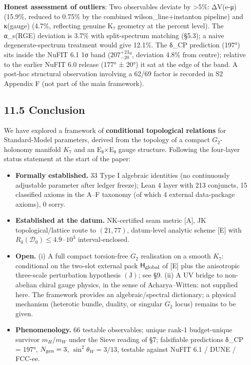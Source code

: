 \documentclass[11pt,a4paper]{article}
\begin{document}
\textbf{Honest assessment of outliers}: Two observables deviate by \textgreater5\%: ΔV(e-μ) (15.9\%, reduced to 0.75\% by the combined wilson\_\allowbreak{}line+instanton pipeline) and κ(gauge) (4.7\%, reflecting genuine K₇ geometry at the percent level). The α\_\allowbreak{}s(RGE) deviation is 3.7\% with split-spectrum matching (§5.3); a naive degenerate-spectrum treatment would give 12.1\%. The δ\_\allowbreak{}CP prediction (197°) sits inside the NuFIT 6.1 1σ band (\(207^{+23}_{-20}\)°, deviation 4.8\% from centre); relative to the earlier NuFIT 6.0 release (177° ± 20°) it sat at the edge of the band. A post-hoc structural observation involving a 62/69 factor is recorded in S2 Appendix F (not part of the main framework).

\subsection{11.5 Conclusion}\label{conclusion}

We have explored a framework of \textbf{conditional topological relations} for Standard-Model parameters, derived from the topology of a compact \(G_2\)-holonomy manifold \(K_7\) and an E₈×E₈ gauge structure. Following the four-layer status statement at the start of the paper:

\begin{itemize}
\tightlist
\item
  \textbf{Formally established.} 33 Type I algebraic identities (no continuously adjustable parameter after ledger freeze); Lean 4 layer with 213 conjuncts, 15 classified axioms in the A--F taxonomy (of which 4 external data-package axioms), 0 sorry.
\item
  \textbf{Established at the datum.} NK-certified seam metric {[}A{]}, JK topological/lattice route to \((21, 77)\), datum-level analytic scheme {[}E{]} with \(R_0(\mathcal D_0) \le 4.9 \cdot 10^3\) interval-enclosed.
\item
  \textbf{Open.} (i) A full compact torsion-free \(G_2\) realisation on a smooth \(K_7\): conditional on the two-slot external pack \(\mathsf H_{\rm global}\) of {[}E{]} plus the anisotropic three-scale perturbation hypothesis \((\mathrm J)\); see §9. (ii) A UV bridge to non-abelian chiral gauge physics, in the sense of Acharya--Witten: not supplied here. The framework provides an algebraic/spectral dictionary; a physical mechanism (heterotic bundle, duality, or singular \(G_2\) locus) remains to be given.
\item
  \textbf{Phenomenology.} 66 testable observables; unique rank-1 budget-unique survivor \(m_H/m_W\) under the Sieve reading of §7; falsifiable predictions δ\_\allowbreak{}CP = 197°, \(N_{\rm gen} = 3\), \(\sin^2\theta_W = 3/13\), testable against NuFIT 6.1 / DUNE / FCC-ee.
\end{itemize}
\end{document}

